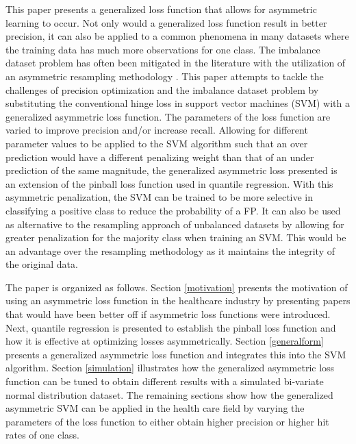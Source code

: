 \documentclass[twoside,11pt]{article}
\begin{document}
This paper presents a generalized loss function that allows for asymmetric learning to occur. Not only would a generalized loss function result in better precision, it can also be applied to a common phenomena in many datasets where the training data has much more observations for one class. The imbalance dataset problem has often been mitigated in the literature with the utilization of an asymmetric resampling methodology \citep{Hamed04}. This paper attempts to tackle the challenges of precision optimization and the imbalance dataset problem by substituting the conventional hinge loss in support vector machines (SVM) with a generalized asymmetric loss function. The parameters of the loss function are varied to improve precision and/or increase recall. Allowing for different parameter values to be applied to the SVM algorithm such that an over prediction would have a different penalizing weight than that of an under prediction of the same magnitude, the generalized asymmetric loss presented is an extension of the pinball loss function \citep{Steinwart07} used in quantile regression. With this asymmetric penalization, the SVM can be trained to be more selective in classifying a positive class to reduce the probability of a FP. It can also be used as alternative to the resampling approach of unbalanced datasets by allowing for greater penalization for the majority class when training an SVM. This would be an advantage over the resampling methodology as it maintains the integrity of the original data.

The paper is organized as follows. Section \ref{motivation} presents the motivation of using an asymmetric loss function in the healthcare industry by presenting papers that would have been better off if asymmetric loss functions were introduced. Next, quantile regression is presented to establish the pinball loss function and how it is effective at optimizing losses asymmetrically. Section \ref{generalform} presents a generalized asymmetric loss function and integrates this into the SVM algorithm. Section \ref{simulation} illustrates how the generalized asymmetric loss function can be tuned to obtain different results with a simulated bi-variate normal distribution dataset. The remaining sections show how the generalized asymmetric SVM can be applied in the health care field by varying the parameters of the loss function to either obtain higher precision or higher hit rates of one class.
\end{document}
